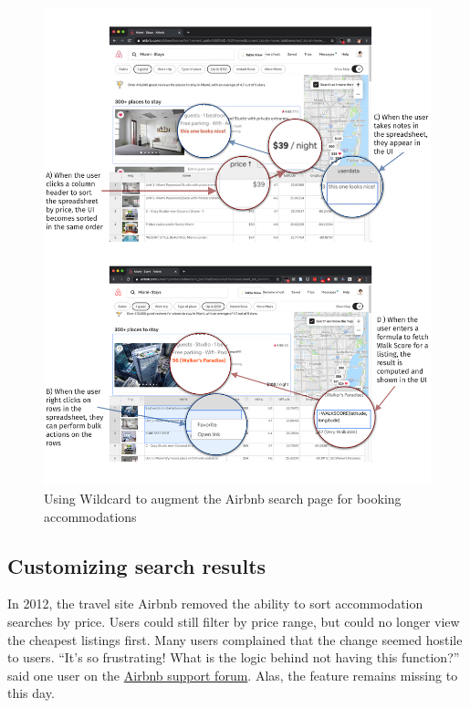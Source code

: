 \documentclass[english,submission]{programming}
\begin{document}
\begin{figure}
\hypertarget{fig:airbnb-demo}{%
\centering
\includegraphics{media/airbnb-demo-300dpi.png}
\caption{Using Wildcard to augment the Airbnb search page for booking
accommodations}\label{fig:airbnb-demo}
}
\end{figure}

\hypertarget{customizing-search-results}{%
\subsection{Customizing search
results}\label{customizing-search-results}}

In 2012, the travel site Airbnb removed the ability to sort
accommodation searches by price. Users could still filter by price
range, but could no longer view the cheapest listings first. Many users
complained that the change seemed hostile to users. ``It's so
frustrating! What is the logic behind not having this function?'' said
one user on the
\href{https://community.withairbnb.com/t5/Hosting/Sorting-listing-by-price/td-p/559404}{Airbnb
support forum}. Alas, the feature remains missing to this day.
\end{document}
